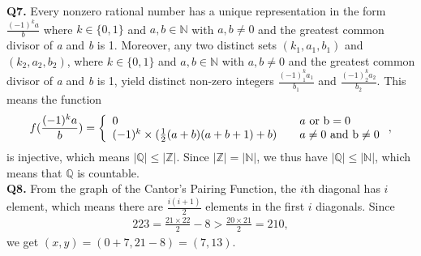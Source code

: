 \documentclass{article}[12pt]
\begin{document}
\noindent \textbf{Q7.}
Every nonzero rational number has a unique representation in the form $\frac{(-1)^ka}{b}$ where $k\in\{0,1\}$ and $a,b\in \mathbb{N}$ with $a,b\not=0$ and the greatest common divisor of \textit{a} and \textit{b} is 1. Moreover, any two distinct sets $(k_1,a_1,b_1)$ and $(k_2,a_2,b_2)$, where $k\in\{0,1\}$ and $a,b\in \mathbb{N}$ with $a,b\not=0$ and the greatest common divisor of \textit{a} and \textit{b} is 1, yield distinct non-zero integers $\frac{(-1)^k_1a_1}{b_1}$ and $\frac{(-1)^k_2a_2}{b_2}$. This means the function 
\begin{equation*}
f(\frac{(-1)^ka}{b})=\left\{
\begin{array}{lcl}
0 & & {a\ \rm{or}\ b =0}\\
(-1)^k\times (\frac{1}{2}(a+b)(a+b+1)+b) & & {a\not=0\ \rm{and}\ b\not=0}\\
\end{array} 
\right.,
\end{equation*}
is injective, which means $|\mathbb{Q}|\leq|\mathbb{Z}|$. Since $|\mathbb{Z}|=|\mathbb{N}|$, we thus have $|\mathbb{Q}|\leq|\mathbb{N}|$, which means that $\mathbb{Q}$ is countable.\\

\noindent \textbf{Q8.}
From the graph of the Cantor's Pairing Function, the $i$th diagonal has $i$ element, which means there are $\frac{i(i+1)}{2}$ elements in the first $i$ diagonals. Since
\begin{align*}
223=\frac{21\times 22}{2}-8>\frac{20\times 21}{2}=210,
\end{align*}
we get $(x,y)=(0+7,21-8)=(7,13)$.\\
\end{document}
